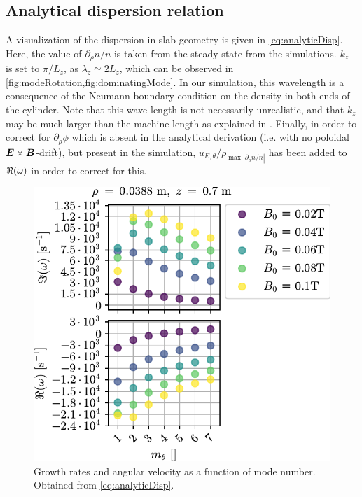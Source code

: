 \subsection{Analytical dispersion relation}
\label{sec:analDisp}
%
A visualization of the dispersion in slab geometry is given in \cref{eq:analyticDisp}.
Here, the value of $\partial_\rho n/n$ is taken from the steady state from the simulations.
$k_z$ is set to $\pi/L_z$, as  $\lambda_z \simeq 2L_z$, which can be observed in \cref{fig:modeRotation,fig:dominatingMode}.
In our simulation, this wavelength is a consequence of the Neumann boundary condition on the density in both ends of the cylinder.
Note that this wave length is not necessarily unrealistic, and that $k_z$ may be much larger than the machine length as explained in \cite{Chen1965}.
Finally, in order to correct for $\partial_\rho\phi$ which is absent in the analytical derivation (i.e. with no poloidal $\boldsymbol{E}\times\boldsymbol{B}$-drift), but present in the simulation, $u_{E,\theta}/\rho_{\max|\partial_\rho n/n|}$ has been added to $\Re(\omega)$ in order to correct for this.
%
\begin{figure}[htb]
    \centering
    \includegraphics{fig/results/growthRates/growthRatesAnalyticB0}
    \caption{Growth rates and angular velocity as a function of mode number.
        Obtained from \cref{eq:analyticDisp}.}
    \label{fig:grAnalytic}
\end{figure}
%

